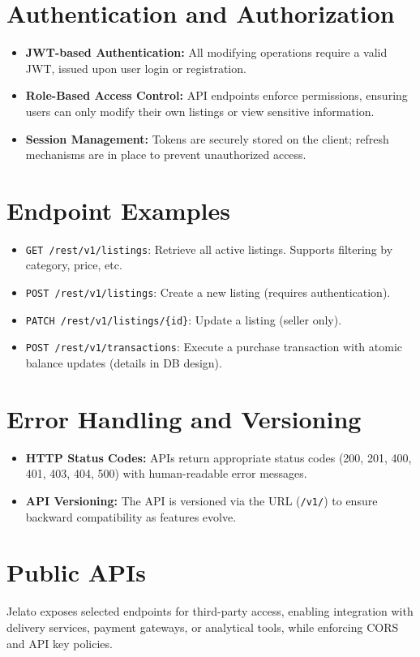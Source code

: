 \documentclass[12pt,a4paper]{report}
\begin{document}
\section{Authentication and Authorization}
\begin{itemize}
    \item \textbf{JWT-based Authentication:} All modifying operations require a valid JWT, issued upon user login or registration.
    \item \textbf{Role-Based Access Control:} API endpoints enforce permissions, ensuring users can only modify their own listings or view sensitive information.
    \item \textbf{Session Management:} Tokens are securely stored on the client; refresh mechanisms are in place to prevent unauthorized access.
\end{itemize}

\section{Endpoint Examples}
\begin{itemize}
    \item \texttt{GET /rest/v1/listings}: Retrieve all active listings. Supports filtering by category, price, etc.
    \item \texttt{POST /rest/v1/listings}: Create a new listing (requires authentication).
    \item \texttt{PATCH /rest/v1/listings/\{id\}}: Update a listing (seller only).
    \item \texttt{POST /rest/v1/transactions}: Execute a purchase transaction with atomic balance updates (details in DB design).
\end{itemize}

\section{Error Handling and Versioning}
\begin{itemize}
    \item \textbf{HTTP Status Codes:} APIs return appropriate status codes (200, 201, 400, 401, 403, 404, 500) with human-readable error messages.
    \item \textbf{API Versioning:} The API is versioned via the URL (\texttt{/v1/}) to ensure backward compatibility as features evolve.
\end{itemize}

\section{Public APIs}
Jelato exposes selected endpoints for third-party access, enabling integration with delivery services, payment gateways, or analytical tools, while enforcing CORS and API key policies.
\end{document}
